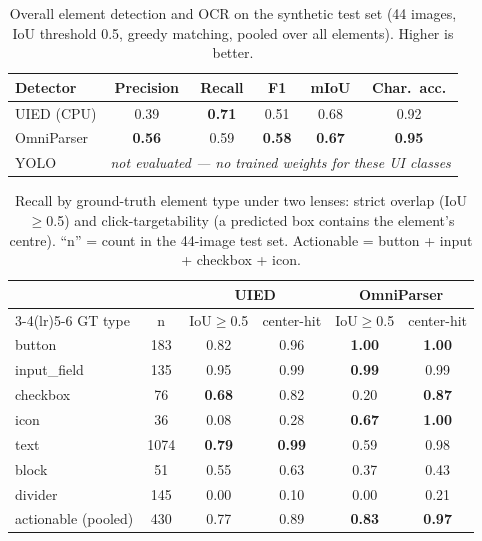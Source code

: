 \documentclass[11pt,a4paper]{article}
\begin{document}
\begin{table}[H]
  \centering
  \caption{Overall element detection and OCR on the synthetic test set (44 images,
  IoU threshold 0.5, greedy matching, pooled over all elements). Higher is better.}
  \label{tab:results}
  \begin{tabular}{lccccc}
    \toprule
    Detector & Precision & Recall & F1 & mIoU & Char.\ acc. \\
    \midrule
    UIED (CPU)   & 0.39 & \textbf{0.71} & 0.51 & 0.68 & 0.92 \\
    OmniParser   & \textbf{0.56} & 0.59 & \textbf{0.58} & \textbf{0.67} & \textbf{0.95} \\
    YOLO         & \multicolumn{5}{c}{\emph{not evaluated --- no trained weights for these UI classes}} \\
    \bottomrule
  \end{tabular}
\end{table}

\begin{table}[H]
  \centering
  \caption{Recall by ground-truth element type under two lenses: strict overlap
  (IoU$\geq$0.5) and click-targetability (a predicted box contains the element's
  centre). ``n'' = count in the 44-image test set. Actionable = button + input +
  checkbox + icon.}
  \label{tab:pertype}
  \begin{tabular}{lc cc cc}
    \toprule
    & & \multicolumn{2}{c}{UIED} & \multicolumn{2}{c}{OmniParser} \\
    \cmidrule(lr){3-4}\cmidrule(lr){5-6}
    GT type & n & IoU$\geq$0.5 & center-hit & IoU$\geq$0.5 & center-hit \\
    \midrule
    button       & 183  & 0.82 & 0.96 & \textbf{1.00} & \textbf{1.00} \\
    input\_field & 135  & 0.95 & 0.99 & \textbf{0.99} & 0.99 \\
    checkbox     & 76   & \textbf{0.68} & 0.82 & 0.20 & \textbf{0.87} \\
    icon         & 36   & 0.08 & 0.28 & \textbf{0.67} & \textbf{1.00} \\
    text         & 1074 & \textbf{0.79} & \textbf{0.99} & 0.59 & 0.98 \\
    block        & 51   & 0.55 & 0.63 & 0.37 & 0.43 \\
    divider      & 145  & 0.00 & 0.10 & 0.00 & 0.21 \\
    \midrule
    actionable (pooled) & 430 & 0.77 & 0.89 & \textbf{0.83} & \textbf{0.97} \\
    \bottomrule
  \end{tabular}
\end{table}
\end{document}
